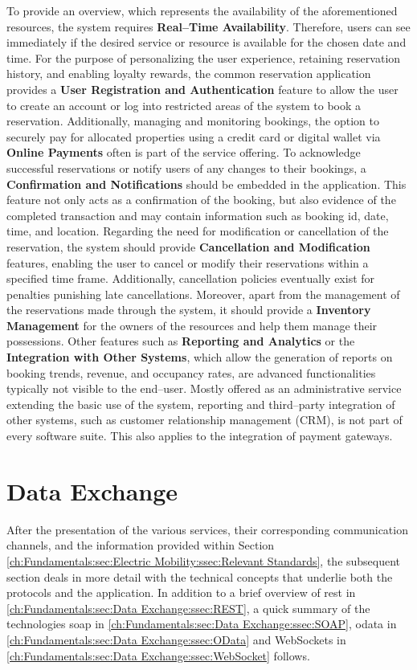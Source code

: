 To provide an overview, which represents the availability of the aforementioned resources, the system requires \textbf{Real--Time Availability}. Therefore, users can see immediately if the desired service or resource is available for the chosen date and time.
For the purpose of personalizing the user experience, retaining reservation history, and enabling loyalty rewards, the common reservation application provides a \textbf{User Registration and Authentication} feature to allow the user to create an account or log into restricted areas of the system to book a reservation.
Additionally, managing and monitoring bookings, the option to securely pay for allocated properties using a credit card or digital wallet via \textbf{Online Payments} often is part of the service offering.
To acknowledge successful reservations or notify users of any changes to their bookings, a \textbf{Confirmation and Notifications} should be embedded in the application. This feature not only acts as a confirmation of the booking, but also evidence of the completed transaction and may contain information such as booking \acrshort{id}, date, time, and location.
Regarding the need for modification or cancellation of the reservation, the system should provide \textbf{Cancellation and Modification} features, enabling the user to cancel or modify their reservations within a specified time frame. Additionally, cancellation policies eventually exist for penalties punishing late cancellations.
Moreover, apart from the management of the reservations made through the system, it should provide a \textbf{Inventory Management} for the owners of the resources and help them manage their possessions.
Other features such as \textbf{Reporting and Analytics} or the \textbf{Integration with Other Systems}, which allow the generation of reports on booking trends, revenue, and occupancy rates, are advanced functionalities typically not visible to the end--user. Mostly offered as an administrative service extending the basic use of the system, reporting and third--party integration of other systems, such as customer relationship management (CRM), is not part of every software suite.
This also applies to the integration of payment gateways.

\section{Data Exchange}
\label{ch:Fundamentals:sec:Data Exchange}

After the presentation of the various services, their corresponding communication channels, and the information provided within Section \ref{ch:Fundamentals:sec:Electric Mobility:ssec:Relevant Standards}, the subsequent section deals in more detail with the technical concepts that underlie both the protocols and the application.
In addition to a brief overview of \acrfull{rest} in \ref{ch:Fundamentals:sec:Data Exchange:ssec:REST}, a quick summary of the technologies \acrfull{soap} in \ref{ch:Fundamentals:sec:Data Exchange:ssec:SOAP}, \acrfull{odata} in \ref{ch:Fundamentals:sec:Data Exchange:ssec:OData} and WebSockets in \ref{ch:Fundamentals:sec:Data Exchange:ssec:WebSocket} follows.

